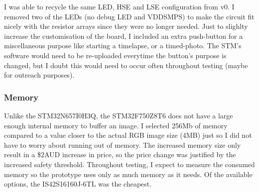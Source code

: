\documentclass[10pt]{article}
\newcommand{\nl}{\newline \newline}
\begin{document}
I was able to recycle the same LED, HSE and LSE configuration from v0. I removed two of the LEDs (no debug LED and VDDSMPS) to make the circuit fit nicely with the resistor arrays since they were no longer needed.
\nl
Just to slighlty increase the customisation of the board, I included an extra push-button for a miscellaneous purpose like starting a timelapse, or a timed-photo. The STM's software would need to be re-uploaded everytime the button's purpose is changed, but I doubt this would need to occur often throughout testing (maybe for outreach purposes).

\subsubsection{Memory}
Unlike the STM32N657I0H3Q, the STM32F750Z8T6 does not have a large enough internal memory to buffer an image.
I selected 256Mb of memory compared to a value closer to the actual RGB image size (4MB) just so I did not have to worry about running out of memory. The increased memory size only result in a \$2AUD increase in price, so the price change was justified by the increased safety threshold.
Throughout testing, I expect to measure the consumed memory so the prototype uses only as much memory as it needs.
Of the available options, the IS42S16160J-6TL was the cheapest.
\end{document}
